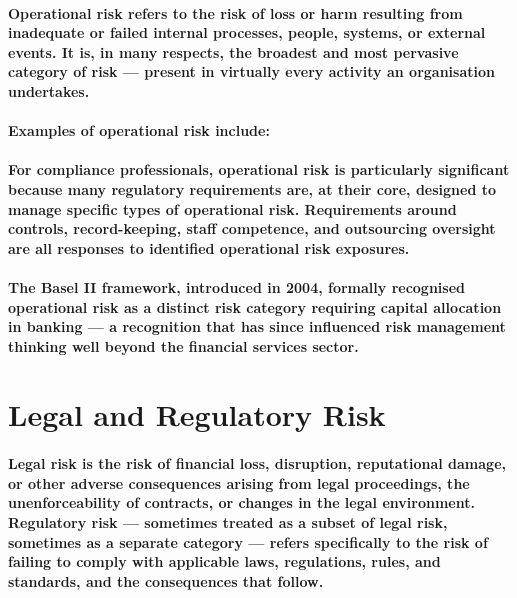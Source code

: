 \paragraph{\textbf{Operational risk} refers to the risk of loss or harm resulting from inadequate or failed internal processes, people, systems, or external events. It is, in many respects, the broadest and most pervasive category of risk — present in virtually every activity an organisation undertakes.}
\paragraph{Examples of operational risk include:}
\begin{itemize}
\end{itemize}
\paragraph{For compliance professionals, operational risk is particularly significant because many regulatory requirements are, at their core, designed to manage specific types of operational risk. Requirements around controls, record-keeping, staff competence, and outsourcing oversight are all responses to identified operational risk exposures.}
\paragraph{The \textbf{Basel II framework}, introduced in 2004, formally recognised operational risk as a distinct risk category requiring capital allocation in banking — a recognition that has since influenced risk management thinking well beyond the financial services sector.}

\section{Legal and Regulatory Risk}
\paragraph{\textbf{Legal risk} is the risk of financial loss, disruption, reputational damage, or other adverse consequences arising from legal proceedings, the unenforceability of contracts, or changes in the legal environment. \textbf{Regulatory risk} — sometimes treated as a subset of legal risk, sometimes as a separate category — refers specifically to the risk of failing to comply with applicable laws, regulations, rules, and standards, and the consequences that follow.}
